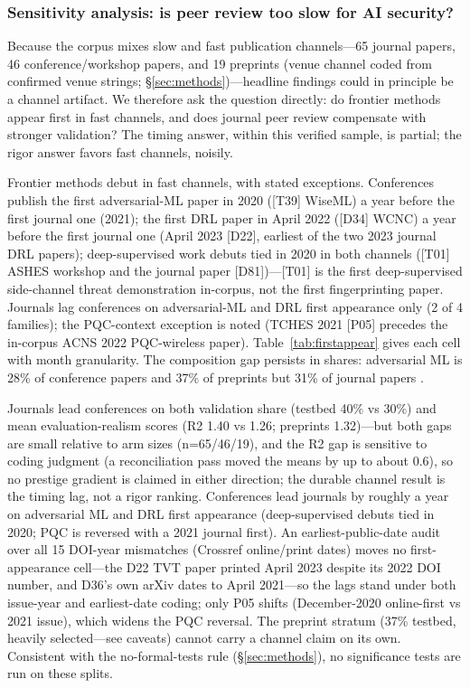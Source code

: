 \subsubsection{Sensitivity analysis: is peer review too slow for AI security?}
\label{sec:sensitivity}
Because the corpus mixes slow and fast publication channels---65 journal papers, 46 conference/workshop papers, and 19 preprints (venue channel coded from confirmed venue strings; \S\ref{sec:methods})---headline findings could in principle be a channel artifact. We therefore ask the question directly: do frontier methods appear first in fast channels, and does journal peer review compensate with stronger validation? The timing answer, within this verified sample, is partial; the rigor answer favors fast channels, noisily.

Frontier methods debut in fast channels, with stated exceptions. Conferences publish the first adversarial-ML paper in 2020 ([T39] WiseML) a year before the first journal one (2021); the first DRL paper in April 2022 ([D34] WCNC) a year before the first journal one (April 2023 [D22], earliest of the two 2023 journal DRL papers); deep-supervised work debuts tied in 2020 in both channels ([T01] ASHES workshop and the journal paper [D81])---[T01] is the first deep-supervised side-channel threat demonstration in-corpus, not the first fingerprinting paper. Journals lag conferences on adversarial-ML and DRL first appearance only (2 of 4 families); the PQC-context exception is noted (TCHES 2021 [P05] precedes the in-corpus ACNS 2022 PQC-wireless paper). Table~\ref{tab:firstappear} gives each cell with month granularity. The composition gap persists in shares: adversarial ML is 28\% of conference papers and 37\% of preprints but 31\% of journal papers .

Journals lead conferences on both validation share (testbed 40\% vs 30\%) and mean evaluation-realism scores (R2 1.40 vs 1.26; preprints 1.32)---but both gaps are small relative to arm sizes (n=65/46/19), and the R2 gap is sensitive to coding judgment (a reconciliation pass moved the means by up to about 0.6), so no prestige gradient is claimed in either direction; the durable channel result is the timing lag, not a rigor ranking. Conferences lead journals by roughly a year on adversarial ML and DRL first appearance (deep-supervised debuts tied in 2020; PQC is reversed with a 2021 journal first). An earliest-public-date audit over all 15 DOI-year mismatches (Crossref online/print dates) moves no first-appearance cell---the D22 TVT paper printed April 2023 despite its 2022 DOI number, and D36's own arXiv dates to April 2021---so the lags stand under both issue-year and earliest-date coding; only P05 shifts (December-2020 online-first vs 2021 issue), which widens the PQC reversal. The preprint stratum (37\% testbed, heavily selected---see caveats) cannot carry a channel claim on its own. Consistent with the no-formal-tests rule (\S\ref{sec:methods}), no significance tests are run on these splits.

